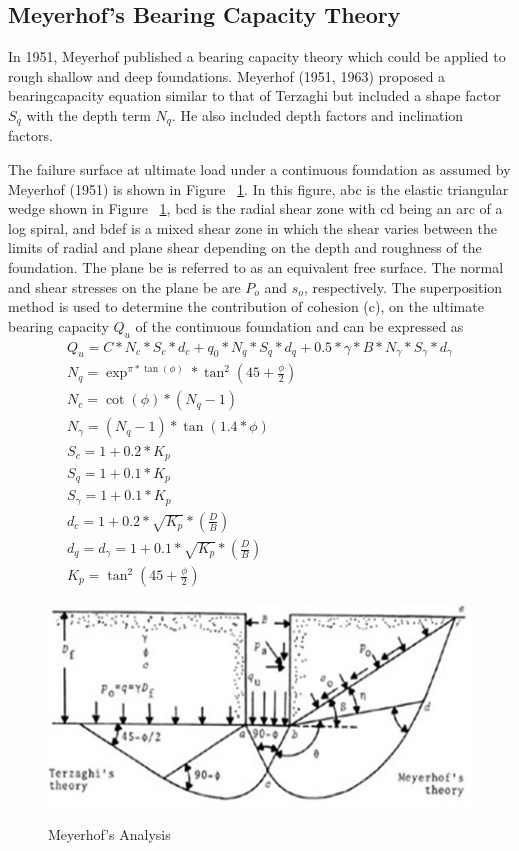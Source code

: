 \subsection{Meyerhof’s Bearing Capacity Theory}
In 1951, Meyerhof published a bearing capacity theory which could be applied to rough shallow and deep foundations. Meyerhof (1951, 1963) proposed a bearing\-capacity equation similar to that of Terzaghi but included a shape factor $S_q$ with the depth term $N_q$. He also included depth factors and inclination factors.\cite{mey_book}
\par
The failure surface at ultimate load under a continuous foundation as assumed by Meyerhof (1951) is shown in Figure ~\ref{meyerhof-analysis}. In this figure, abc is the elastic triangular wedge shown in Figure ~\ref{meyerhof-analysis}, bcd is the radial shear zone with cd being an arc of a log spiral, and bdef is a mixed shear zone in which the shear varies between the limits of radial and plane shear depending on the depth and roughness of the foundation. The plane be is referred to as an equivalent free surface. The normal and shear stresses on the plane be are $P_o$ and $s_o$, respectively. The superposition method is used to determine the contribution of cohesion (c), on the ultimate bearing capacity $Q_u$ of the continuous foundation and can be expressed as
\begin{gather}
Q_u = C * N_c * S_c * d_c + q_0 * N_q * S_q * d_q + 0.5 * {\gamma} * B * N_{\gamma}*S_{\gamma}*d_{\gamma}\\
N_q = \exp^{\pi * \tan(\phi)} * \tan^2 ( 45 + \frac{\phi}{2} )\\
N_c = \cot(\phi)*(N_q - 1)\\
N_{\gamma} = (N_q-1) * \tan(1.4*\phi)\\
S_c = 1 + 0.2 * K_p\\
S_q=1+0.1*K_p\\
S_{\gamma}=1+0.1*K_p\\
d_c=1+0.2*\sqrt{K_p}*(\frac{D}{B})\\
d_q=d_{\gamma}=1+0.1*\sqrt{K_p}*(\frac{D}{B})\\
K_p= \tan ^ 2 (45 + \frac{\phi}{2})
\end{gather}
\begin{figure}
\centering
\caption{Meyerhof’s Analysis\cite{mey_book}}
\includegraphics{images/main/meyerhof-analysis.png}
\label{meyerhof-analysis}
\end{figure}


